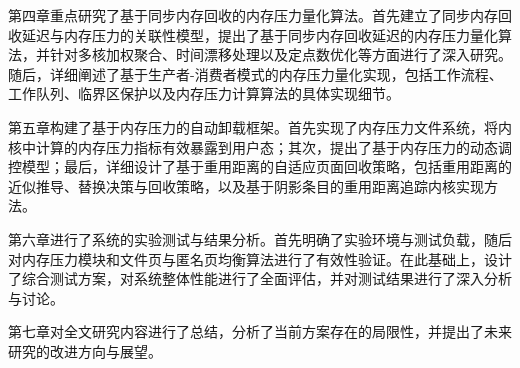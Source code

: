第四章重点研究了基于同步内存回收的内存压力量化算法。首先建立了同步内存回收延迟与内存压力的关联性模型，提出了基于同步内存回收延迟的内存压力量化算法，并针对多核加权聚合、时间漂移处理以及定点数优化等方面进行了深入研究。随后，详细阐述了基于生产者-消费者模式的内存压力量化实现，包括工作流程、工作队列、临界区保护以及内存压力计算算法的具体实现细节。

第五章构建了基于内存压力的自动卸载框架。首先实现了内存压力文件系统，将内核中计算的内存压力指标有效暴露到用户态；其次，提出了基于内存压力的动态调控模型；最后，详细设计了基于重用距离的自适应页面回收策略，包括重用距离的近似推导、替换决策与回收策略，以及基于阴影条目的重用距离追踪内核实现方法。

第六章进行了系统的实验测试与结果分析。首先明确了实验环境与测试负载，随后对内存压力模块和文件页与匿名页均衡算法进行了有效性验证。在此基础上，设计了综合测试方案，对系统整体性能进行了全面评估，并对测试结果进行了深入分析与讨论。

第七章对全文研究内容进行了总结，分析了当前方案存在的局限性，并提出了未来研究的改进方向与展望。


